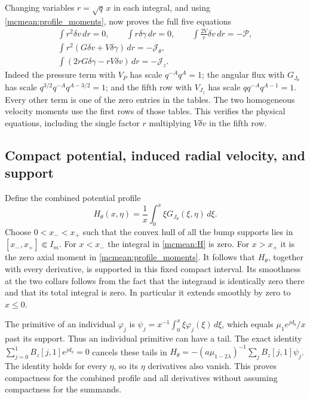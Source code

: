 Changing variables \(r=\sqrt q\,x\) in each integral, and using
\eqref{mcmean:profile_moments}, now proves the full five equations
\begin{equation}\label{mcmean:five_rows}
\begin{gathered}
 \int r^2\delta v\,dr=0,\qquad
 \int r\delta\gamma\,dr=0,\qquad
 \int\frac{2V}{r}\delta v\,dr=-\mathcal P,\\
 \int r^2(G\delta v+V\delta\gamma)\,dr=-\mathcal J_\theta,\\
 \int(2rG\delta\gamma-rV\delta v)\,dr=-\mathcal J_z.
\end{gathered}
\end{equation}
Indeed the pressure term with \(V_P\) has scale
\(q^{-A}q^A=1\); the angular flux with \(G_{J_\theta}\) has scale
\(q^{3/2}q^{-A}q^{A-3/2}=1\); and the fifth row with
\(V_{J_z}\) has scale \(q q^{-A}q^{A-1}=1\).
Every other term is one of the zero entries in the tables. The two
homogeneous velocity moments use the first rows of those tables.
This verifies the physical equations, including the single factor
\(r\) multiplying \(V\delta v\) in the fifth row.

\subsection{Compact potential, induced radial velocity, and support}

Define the combined potential profile
\begin{equation}\label{mcmean:H}
 H_\theta(x,\eta)=\frac1x\int_0^x\xi G_{J_\theta}(\xi,\eta)\,d\xi.
\end{equation}
Choose \(0<x_-<x_+\) such that the convex hull of all the bump
supports lies in \([x_-,x_+]\Subset I_m\). For \(x<x_-\) the
integral in \eqref{mcmean:H} is zero. For \(x>x_+\) it is the
zero axial moment in \eqref{mcmean:profile_moments}.
It follows that \(H_\theta\), together with every derivative, is
supported in this fixed compact interval. Its smoothness at the two
collars follows from the fact that the integrand is identically zero
there and that its total integral is zero. In particular it extends
smoothly by zero to \(x\le0\).

The primitive of an individual \(\varphi_j\) is
\(\psi_j=x^{-1}\int_0^x\xi\varphi_j(\xi)\,d\xi\), which equals
\(\mu_1e^{jd_b}/x\) past its support. Thus an individual primitive
can have a tail. The exact identity
\(\sum_{j=0}^1 B_z[j,1]e^{jd_b}=0\) cancels these tails in
\(H_\theta=-(a\mu_{1-2\lambda})^{-1}\sum_j B_z[j,1]\psi_j\).
The identity holds for every \(\eta\), so its \(\eta\) derivatives
also vanish. This proves compactness for the combined profile and
all derivatives without assuming compactness for the summands.

